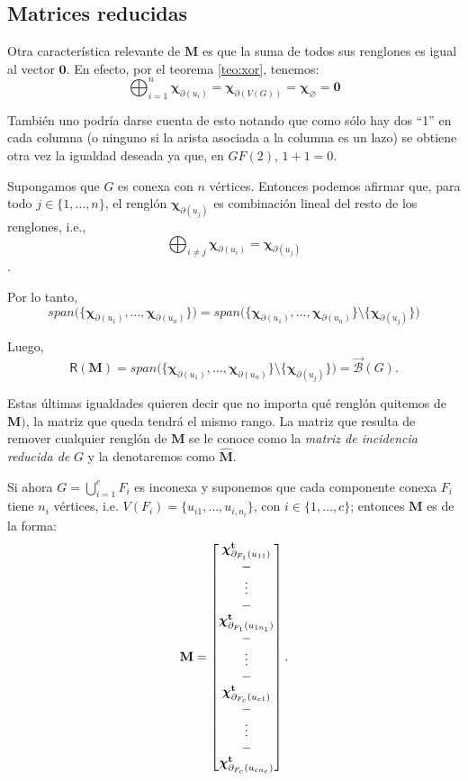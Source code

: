 \subsection{Matrices reducidas}

Otra característica relevante de $\mathbf{M}$ es que la suma de todos sus renglones es igual al vector $\mathbf{0}$. En efecto, por el teorema \ref{teo:xor}, tenemos:
$$
\bigoplus_{i=1}^{n} \boldsymbol{\chi}_{\partial(u_{i})} = \boldsymbol{\chi}_{\partial(V(G))} = \boldsymbol{\chi}_{\varnothing} = \mathbf{0}
$$

También uno podría darse cuenta de esto notando que como sólo hay dos ``1'' en cada columna (o ninguno si la arista asociada  a la columna es un lazo) se obtiene otra vez la igualdad deseada ya que, en $GF(2)$, $1+1=0$.

Supongamos que $G$ es conexa con $n$ vértices. Entonces podemos afirmar que, para todo $j \in \{1, \ldots, n\}$, el renglón $\boldsymbol{\chi}_{\partial(u_{j})}$ es combinación lineal del resto de los renglones, i.e., $$\bigoplus_{i\neq j} \boldsymbol{\chi}_{\partial(u_{i})} = \boldsymbol{\chi}_{\partial(u_{j})}$$.

Por lo tanto, 
$$
 span\Big(\{\boldsymbol{\chi}_{\partial(u_{1})}, \ldots, \boldsymbol{\chi}_{\partial(u_{n})} \}\Big) =
span\Big (\{ \boldsymbol{\chi}_{\partial(u_{1})}, \ldots, \boldsymbol{\chi}_{\partial(u_{n})} \} \setminus \{\boldsymbol{\chi}_{\partial(u_{j})} \}\Big )
$$

Luego, 
$$
\mathsf{R}(\mathbf{M}) = span \Big (\{ \boldsymbol{\chi}_{\partial(u_{1})}, \ldots, \boldsymbol{\chi}_{\partial(u_{n})} \} \setminus \{\boldsymbol{\chi}_{\partial(u_{j})} \} \Big) = \overrightarrow{\mathcal{B}}(G).
$$

Estas últimas igualdades quieren decir que no importa qué renglón quitemos de $\mathbf{M})$, la matriz que queda tendrá el mismo rango. La matriz que resulta de remover cualquier renglón de $\mathbf{M}$ se le conoce como la \textit{matriz de incidencia reducida de} $G$ y la denotaremos como $\widehat{\mathbf{M}}$.

Si ahora $G=\bigcup_{i=1}^{c} F_{i}$ es inconexa y suponemos que cada componente conexa $F_{i}$ tiene $n_{i}$ vértices, i.e. $V(F_{i}) = \{u_{i1}, \ldots, u_{i,n_{i}} \}$, con $i\in \{1, \ldots, c\}$; entonces $\mathbf{M}$ es de la forma:
$$\mathbf{M} = 
\begin{bmatrix}
\boldsymbol{\chi}_{\partial_{F_{1}}(u_{11})}^{\mathbf{t}}\\ 
\-- \\
\vdots \\
\-- \\
\boldsymbol{\chi}_{\partial_{F_{1}}(u_{1n_{1}})}^{\mathbf{t}}\\ 
\-- \\
\vdots \\
\-- \\
\boldsymbol{\chi}_{\partial_{F_{c}}(u_{c1})}^{\mathbf{t}}\\
\-- \\
\vdots \\
\-- \\
\boldsymbol{\chi}_{\partial_{F_{c}}(u_{cn_{c}})}^{\mathbf{t}}
\end{bmatrix}.
$$

